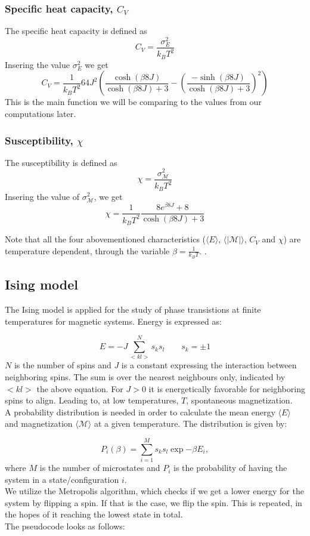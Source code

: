 \documentclass[../main.tex]{subfiles}
\begin{document}
\subsubsection*{Specific heat capacity, $C_V$}
The specific heat capacity is defined as
\[C_V = \frac{\sigma_E^2}{k_B T^2}\]
Insering the value $\sigma^2_E$ we get
\[C_V = \frac{1}{k_B T^2}64J^2\left(\frac{\cosh(\beta 8 J)}{\cosh(\beta 8 J) + 3} -\left(\frac{-\sinh(\beta 8 J)}{\cosh(\beta 8 J) + 3}\right)^2  \right)\]
This is the main function we will be comparing to the values from our computations later.

\subsubsection*{Susceptibility, $\chi$}
The susceptibility is defined as
\[\chi = \frac{\sigma^2_\mathcal{M}}{k_B T^2}\]
Insering the value of $\sigma^2_\mathcal{M}$, we get
\[\chi = \frac{1}{k_B T^2}\frac{8 e^{\beta8J} +  8}{\cosh(\beta 8J) + 3}\]

\noindent Note that all the four abovementioned characteristics ($\langle E\rangle$, $\langle |\mathcal M|\rangle$, $C_V$ and $\chi$) are temperature dependent, through the variable $\beta = \frac{1}{k_B T}$. \cite{Mortenstatphys2019}.

\subsection{Ising model}
The Ising model is applied for the study of phase transistions at finite temperatures
for magnetic systems. Energy is expressed as:

\begin{equation}
  E = -J \sum  _{<kl>}^N s_ks_l \qquad s_k = \pm 1
\end{equation}
$N$ is the number of spins and $J$ is a constant expressing the interaction between neighboring spins. The sum is over the nearest neighbours only, indicated by $<kl>$ the above equation. For $J>0$ it is energetically favorable for neighboring spins to align. Leading to, at low temperatures, $T$, spontaneous magnetization.\\
A probability distribution is needed in order to calculate the mean energy $\langle E \rangle$ and magnetization $\langle \mathcal M \rangle$ at a given temperature. The distribution is given by:

\begin{equation}
  P_i(\beta)=  \sum  _{i = 1}^M s_ks_l \exp{-\beta E_i},
\end{equation}
where $M$ is the number of microstates and $P_i$ is the probability of having the system in a state/configuration $i$.\\
We utilize the Metropolis algorithm, which checks if we get a lower energy for the system by flipping a spin. If that is the case, we flip the spin. This is repeated, in the hopes of it reaching the lowest state in total. \\
The pseudocode looks as follows:
\end{document}
